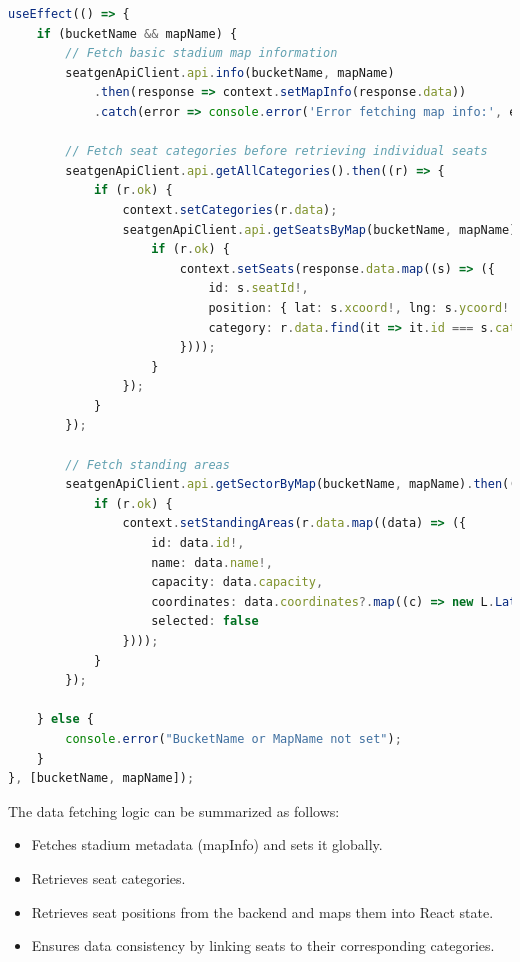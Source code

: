\begin{lstlisting}[language=TypeScript, caption=Fetching Seat and Category Data, label=lst:fetch-seats]
useEffect(() => {
    if (bucketName && mapName) {
        // Fetch basic stadium map information
        seatgenApiClient.api.info(bucketName, mapName)
            .then(response => context.setMapInfo(response.data))
            .catch(error => console.error('Error fetching map info:', error));

        // Fetch seat categories before retrieving individual seats
        seatgenApiClient.api.getAllCategories().then((r) => {
            if (r.ok) {
                context.setCategories(r.data);
                seatgenApiClient.api.getSeatsByMap(bucketName, mapName).then(response => {
                    if (r.ok) {
                        context.setSeats(response.data.map((s) => ({
                            id: s.seatId!,
                            position: { lat: s.xcoord!, lng: s.ycoord! },
                            category: r.data.find(it => it.id === s.categoryId) ?? null
                        })));
                    }
                });
            }
        });

        // Fetch standing areas
        seatgenApiClient.api.getSectorByMap(bucketName, mapName).then((r) => {
            if (r.ok) {
                context.setStandingAreas(r.data.map((data) => ({
                    id: data.id!,
                    name: data.name!,
                    capacity: data.capacity,
                    coordinates: data.coordinates?.map((c) => new L.LatLng(c.x!, c.y!)) ?? [],
                    selected: false
                })));
            }
        });

    } else {
        console.error("BucketName or MapName not set");
    }
}, [bucketName, mapName]);
\end{lstlisting}

The data fetching logic can be summarized as follows:

\begin{itemize}
    \item Fetches stadium metadata (mapInfo) and sets it globally.
    \item Retrieves seat categories.
    \item Retrieves seat positions from the backend and maps them into React state.
    \item Ensures data consistency by linking seats to their corresponding categories.
\end{itemize}

